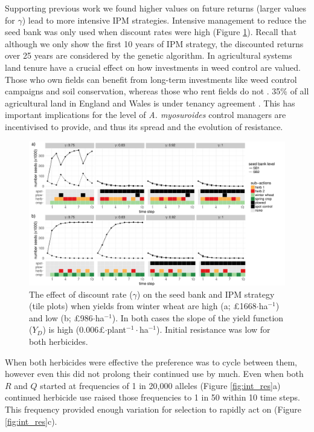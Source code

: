\documentclass[9pt,twocolumn,twoside,lineno]{pnas-new}
\begin{document}
Supporting previous work \citep{EpanN2010} we found higher values on future returns (larger values for $\gamma$) lead to more intensive IPM strategies. Intensive management to reduce the seed bank was only used when discount rates were high (Figure \ref{fig:dis_rate}). Recall that although we only show the first 10 years of IPM strategy, the discounted returns over 25 years are considered by the genetic algorithm. In agricultural systems land tenure have a crucial effect on how investments in weed control are valued. Those who own fields can benefit from long-term investments like weed control campaigns and soil conservation, whereas those who rent fields do not \citep{Wies1996, Fras2004}. 35\% of all agricultural land in England and Wales is under tenancy agreement \citep{CAAV2017}. This has important implications for the level of \textit{A. myosuroides} control managers are incentivised to provide, and thus its spread and the evolution of resistance.       
\begin{figure}
	\includegraphics[width=178mm]{dis_rate_SB_strat.pdf}
	\caption{The effect of discount rate ($\gamma$) on the seed bank and IPM strategy (tile plots) when yields from winter wheat are high (a; \pounds 1668$\cdot$ha$^{-1}$) and low (b; \pounds 986$\cdot$ha$^{-1}$). In both cases the slope of the yield function ($Y_D$) is high (0.006\pounds$\cdot$plant$^{-1}\cdot$ha$^{-1}$). Initial resistance was low for both herbicides.}
	\label{fig:dis_rate} 
\end{figure}

When both herbicides were effective the preference was to cycle between them, however even this did not prolong their continued use by much. Even when both $R$ and $Q$ started at frequencies of 1 in 20,000 alleles (Figure \ref{fig:int_res}a) continued herbicide use raised those frequencies to 1 in 50 within 10 time steps. This frequency provided enough variation for selection to rapidly act on (Figure \ref{fig:int_res}c). 
\end{document}
